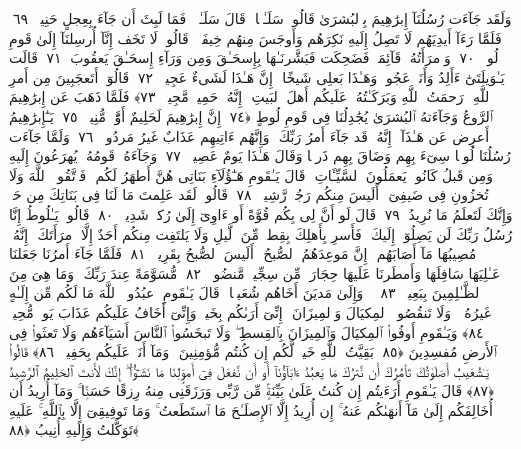  وَلَقَد جَآءَت رُسُلُنَآ إِبرَٰهِيمَ بِٱلبُشرَىٰ قَالُوا۟ سَلَـٰمًۭا ۖ قَالَ سَلَـٰمٌۭ ۖ فَمَا لَبِثَ أَن جَآءَ بِعِجلٍ حَنِيذٍۢ ﴿٦٩﴾
 فَلَمَّا رَءَآ أَيدِيَهُم لَا تَصِلُ إِلَيهِ نَكِرَهُم وَأَوجَسَ مِنهُم خِيفَةًۭ ۚ قَالُوا۟ لَا تَخَف إِنَّآ أُرسِلنَآ إِلَىٰ قَومِ لُوطٍۢ ﴿٧٠﴾
 وَٱمرَأَتُهُۥ قَآئِمَةٌۭ فَضَحِكَت فَبَشَّرنَـٰهَا بِإِسحَـٰقَ وَمِن وَرَآءِ إِسحَـٰقَ يَعقُوبَ ﴿٧١﴾
 قَالَت يَـٰوَيلَتَىٰٓ ءَأَلِدُ وَأَنَا۠ عَجُوزٌۭ وَهَـٰذَا بَعلِى شَيخًا ۖ إِنَّ هَـٰذَا لَشَىءٌ عَجِيبٌۭ ﴿٧٢﴾
 قَالُوٓا۟ أَتَعجَبِينَ مِن أَمرِ ٱللَّهِ ۖ رَحمَتُ ٱللَّهِ وَبَرَكَـٰتُهُۥ عَلَيكُم أَهلَ ٱلبَيتِ ۚ إِنَّهُۥ حَمِيدٌۭ مَّجِيدٌۭ ﴿٧٣﴾
 فَلَمَّا ذَهَبَ عَن إِبرَٰهِيمَ ٱلرَّوعُ وَجَآءَتهُ ٱلبُشرَىٰ يُجَٰدِلُنَا فِى قَومِ لُوطٍ ﴿٧٤﴾
 إِنَّ إِبرَٰهِيمَ لَحَلِيمٌ أَوَّٰهٌۭ مُّنِيبٌۭ ﴿٧٥﴾
 يَـٰٓإِبرَٰهِيمُ أَعرِض عَن هَـٰذَآ ۖ إِنَّهُۥ قَد جَآءَ أَمرُ رَبِّكَ ۖ وَإِنَّهُم ءَاتِيهِم عَذَابٌ غَيرُ مَردُودٍۢ ﴿٧٦﴾
 وَلَمَّا جَآءَت رُسُلُنَا لُوطًۭا سِىٓءَ بِهِم وَضَاقَ بِهِم ذَرعًۭا وَقَالَ هَـٰذَا يَومٌ عَصِيبٌۭ ﴿٧٧﴾
 وَجَآءَهُۥ قَومُهُۥ يُهرَعُونَ إِلَيهِ وَمِن قَبلُ كَانُوا۟ يَعمَلُونَ ٱلسَّيِّـَٔاتِ ۚ قَالَ يَـٰقَومِ هَـٰٓؤُلَآءِ بَنَاتِى هُنَّ أَطهَرُ لَكُم ۖ فَٱتَّقُوا۟ ٱللَّهَ وَلَا تُخزُونِ فِى ضَيفِىٓ ۖ أَلَيسَ مِنكُم رَجُلٌۭ رَّشِيدٌۭ ﴿٧٨﴾
 قَالُوا۟ لَقَد عَلِمتَ مَا لَنَا فِى بَنَاتِكَ مِن حَقٍّۢ وَإِنَّكَ لَتَعلَمُ مَا نُرِيدُ ﴿٧٩﴾
 قَالَ لَو أَنَّ لِى بِكُم قُوَّةً أَو ءَاوِىٓ إِلَىٰ رُكنٍۢ شَدِيدٍۢ ﴿٨٠﴾
 قَالُوا۟ يَـٰلُوطُ إِنَّا رُسُلُ رَبِّكَ لَن يَصِلُوٓا۟ إِلَيكَ ۖ فَأَسرِ بِأَهلِكَ بِقِطعٍۢ مِّنَ ٱلَّيلِ وَلَا يَلتَفِت مِنكُم أَحَدٌ إِلَّا ٱمرَأَتَكَ ۖ إِنَّهُۥ مُصِيبُهَا مَآ أَصَابَهُم ۚ إِنَّ مَوعِدَهُمُ ٱلصُّبحُ ۚ أَلَيسَ ٱلصُّبحُ بِقَرِيبٍۢ ﴿٨١﴾
 فَلَمَّا جَآءَ أَمرُنَا جَعَلنَا عَـٰلِيَهَا سَافِلَهَا وَأَمطَرنَا عَلَيهَا حِجَارَةًۭ مِّن سِجِّيلٍۢ مَّنضُودٍۢ ﴿٨٢﴾
 مُّسَوَّمَةً عِندَ رَبِّكَ ۖ وَمَا هِىَ مِنَ ٱلظَّـٰلِمِينَ بِبَعِيدٍۢ ﴿٨٣﴾
 ۞ وَإِلَىٰ مَديَنَ أَخَاهُم شُعَيبًۭا ۚ قَالَ يَـٰقَومِ ٱعبُدُوا۟ ٱللَّهَ مَا لَكُم مِّن إِلَـٰهٍ غَيرُهُۥ ۖ وَلَا تَنقُصُوا۟ ٱلمِكيَالَ وَٱلمِيزَانَ ۚ إِنِّىٓ أَرَىٰكُم بِخَيرٍۢ وَإِنِّىٓ أَخَافُ عَلَيكُم عَذَابَ يَومٍۢ مُّحِيطٍۢ ﴿٨٤﴾
 وَيَـٰقَومِ أَوفُوا۟ ٱلمِكيَالَ وَٱلمِيزَانَ بِٱلقِسطِ ۖ وَلَا تَبخَسُوا۟ ٱلنَّاسَ أَشيَآءَهُم وَلَا تَعثَوا۟ فِى ٱلأَرضِ مُفسِدِينَ ﴿٨٥﴾
 بَقِيَّتُ ٱللَّهِ خَيرٌۭ لَّكُم إِن كُنتُم مُّؤمِنِينَ ۚ وَمَآ أَنَا۠ عَلَيكُم بِحَفِيظٍۢ ﴿٨٦﴾
 قَالُوا۟ يَـٰشُعَيبُ أَصَلَوٰتُكَ تَأمُرُكَ أَن نَّترُكَ مَا يَعبُدُ ءَابَآؤُنَآ أَو أَن نَّفعَلَ فِىٓ أَموَٟلِنَا مَا نَشَـٰٓؤُا۟ ۖ إِنَّكَ لَأَنتَ ٱلحَلِيمُ ٱلرَّشِيدُ ﴿٨٧﴾
 قَالَ يَـٰقَومِ أَرَءَيتُم إِن كُنتُ عَلَىٰ بَيِّنَةٍۢ مِّن رَّبِّى وَرَزَقَنِى مِنهُ رِزقًا حَسَنًۭا ۚ وَمَآ أُرِيدُ أَن أُخَالِفَكُم إِلَىٰ مَآ أَنهَىٰكُم عَنهُ ۚ إِن أُرِيدُ إِلَّا ٱلإِصلَـٰحَ مَا ٱستَطَعتُ ۚ وَمَا تَوفِيقِىٓ إِلَّا بِٱللَّهِ ۚ عَلَيهِ تَوَكَّلتُ وَإِلَيهِ أُنِيبُ ﴿٨٨﴾

